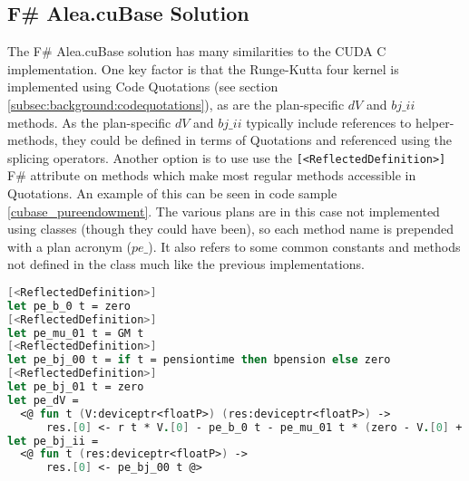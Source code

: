 \subsection{F\# Alea.cuBase Solution}
The F\# Alea.cuBase solution has many similarities to the CUDA C implementation.
One key factor is that the Runge-Kutta four kernel is implemented using Code Quotations (see section \ref{subsec:background:codequotations}), as are the plan-specific $dV$ and $bj\_ii$ methods.
As the plan-specific $dV$ and $bj\_ii$ typically include references to helper-methods, they could be defined in terms of Quotations and referenced using the splicing operators.
Another option is to use use the \lstinline$[<ReflectedDefinition>]$ F\# attribute on methods which make most regular methods accessible in Quotations.
An example of this can be seen in code sample \ref{cubase_pureendowment}. 
The various plans are in this case not implemented using classes (though they could have been), so each method name is prepended with a plan acronym ($pe\_$).
It also refers to some common constants and methods not defined in the class much like the previous implementations.
\begin{lstlisting}[language=FSharp, caption=The pure endowment insurance plan expressed in F\# Alea.cuBase, label=cubase_pureendowment]
[<ReflectedDefinition>] 
let pe_b_0 t = zero
[<ReflectedDefinition>]
let pe_mu_01 t = GM t
[<ReflectedDefinition>]
let pe_bj_00 t = if t = pensiontime then bpension else zero
[<ReflectedDefinition>]
let pe_bj_01 t = zero
let pe_dV = 
  <@ fun t (V:deviceptr<floatP>) (res:deviceptr<floatP>) -> 
      res.[0] <- r t * V.[0] - pe_b_0 t - pe_mu_01 t * (zero - V.[0] + pe_bj_01 t) @>
let pe_bj_ii = 
  <@ fun t (res:deviceptr<floatP>) ->
      res.[0] <- pe_bj_00 t @>
\end{lstlisting}

